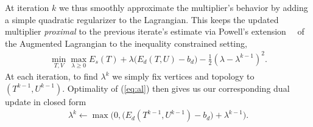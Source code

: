 At iteration $k$ we thus smoothly approximate the multiplier's behavior by adding a simple quadratic regularizer to the Lagrangian. This keeps the updated multiplier \emph{proximal} to the previous iterate's estimate via Powell's extension\ \cite{}~ of the Augmented Lagrangian to the inequality constrained setting,
\begin{align}
\label{eq:al}
	\min_{T,V} \max_{\lambda \geq 0} E_{s}(T) + \lambda \big( E_{d}(T, U) - b_d\big) - \tfrac{1}{2} (\lambda- \lambda^{k-1})^2. 
\end{align} 
At each iteration, to find $\lambda^k$ we simply fix vertices and topology to  $(T^{k-1},U^{k-1})$. Optimality of (\ref{eq:al}) then gives us our corresponding dual update in closed form
\begin{align}
\lambda^{k} \leftarrow \max\big(0,\big( E_{d}(T^{k-1}, U^{k-1}) -b_d \big) + \lambda^{k-1}\big).	
\end{align}






%
%



